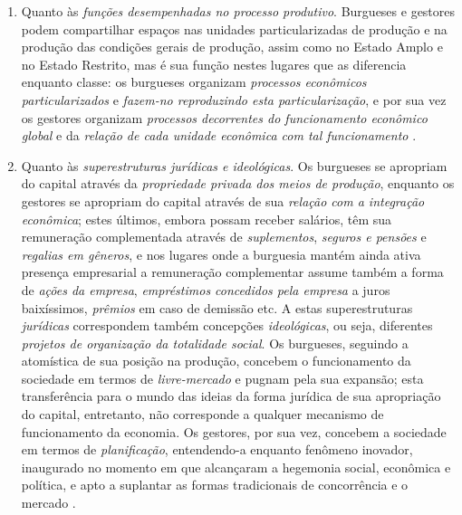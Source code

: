\begin{enumerate}
\item Quanto às \textit{funções desempenhadas no processo produtivo}. Burgueses e gestores podem compartilhar espaços nas unidades particularizadas de produção e na produção das condições gerais de produção, assim como no Estado Amplo e no Estado Restrito, mas é sua função nestes lugares que as diferencia enquanto classe: os burgueses organizam \textit{processos econômicos particularizados} e \textit{fazem-no reproduzindo esta particularização}, e por sua vez os gestores organizam \textit{processos decorrentes do funcionamento econômico global }e da \textit{relação de cada unidade econômica com tal funcionamento} \cite[p.~203-204]{BERNARDO1991}. 
\item Quanto às \textit{superestruturas jurídicas e ideológicas}. Os burgueses se apropriam do capital através da \textit{propriedade privada dos meios de produção}, enquanto os gestores se apropriam do capital através de sua \textit{relação com a integração econômica}; estes últimos, embora possam receber salários, têm sua remuneração complementada através de \textit{suplementos}, \textit{seguros e pensões} e \textit{regalias em gêneros}, e nos lugares onde a burguesia mantém ainda ativa presença empresarial a remuneração complementar assume também a forma de \textit{ações da empresa}, \textit{empréstimos concedidos pela empresa} a juros baixíssimos, \textit{prêmios} em caso de demissão etc. A estas superestruturas \textit{jurídicas} correspondem também concepções \textit{ideológicas}, ou seja, diferentes \textit{projetos de organização da totalidade social}. Os burgueses, seguindo a atomística de sua posição na produção, concebem o funcionamento da sociedade em termos de \textit{livre-mercado} e pugnam pela sua expansão; esta transferência para o mundo das ideias da forma jurídica de sua apropriação do capital, entretanto, não corresponde a qualquer mecanismo de funcionamento da economia. Os gestores, por sua vez, concebem a sociedade em termos de \textit{planificação}, entendendo-a enquanto fenômeno inovador, inaugurado no momento em que alcançaram a hegemonia social, econômica e política, e apto a suplantar as formas tradicionais de concorrência e o mercado \cite[p.~204-208]{BERNARDO1991}. 

\end{enumerate}
